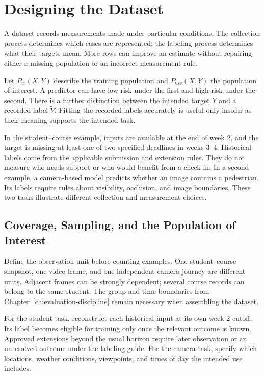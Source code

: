 \begingroup
\raggedbottom
{}
\chapter{Designing the Dataset}
\label{ch:dataset-design}

A dataset records measurements made under particular conditions. The collection process determines which cases are represented; the labeling process determines what their targets mean. More rows can improve an estimate without repairing either a missing population or an incorrect measurement rule.

Let $P_{\mathrm{tr}}(X,Y)$ describe the training population and $P_{\mathrm{use}}(X,Y)$ the population of interest. A predictor can have low risk under the first and high risk under the second. There is a further distinction between the intended target $Y$ and a recorded label $\tilde Y$. Fitting the recorded labels accurately is useful only insofar as their meaning supports the intended task.

In the student--course example, inputs are available at the end of week 2, and the target is missing at least one of two specified deadlines in weeks 3--4. Historical labels come from the applicable submission and extension rules. They do not measure who needs support or who would benefit from a check-in. In a second example, a camera-based model predicts whether an image contains a pedestrian. Its labels require rules about visibility, occlusion, and image boundaries. These two tasks illustrate different collection and measurement choices.

\section{Coverage, Sampling, and the Population of Interest}

Define the observation unit before counting examples. One student--course snapshot, one video frame, and one independent camera journey are different units. Adjacent frames can be strongly dependent; several course records can belong to the same student. The group and time boundaries from Chapter~\ref{ch:evaluation-discipline} remain necessary when assembling the dataset.

For the student task, reconstruct each historical input at its own week-2 cutoff. Its label becomes eligible for training only once the relevant outcome is known. Approved extensions beyond the usual horizon require later observation or an unresolved outcome under the labeling guide. For the camera task, specify which locations, weather conditions, viewpoints, and times of day the intended use includes.

